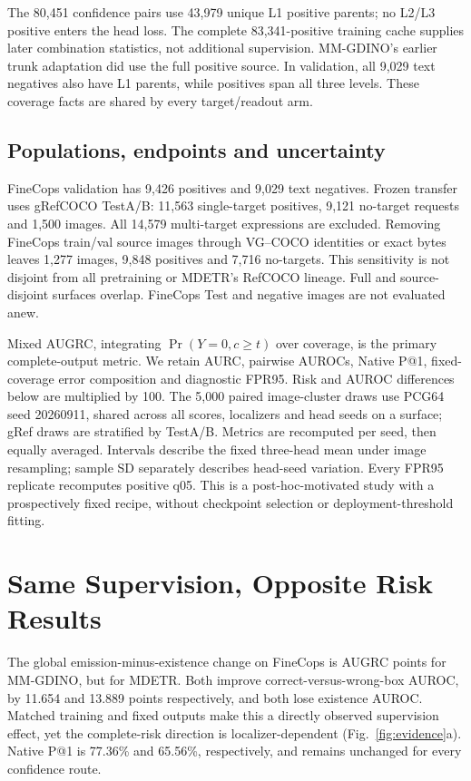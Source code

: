 \documentclass[10pt,twocolumn,letterpaper]{article}
\begin{document}
The 80,451 confidence pairs use 43,979 unique L1 positive parents;
no L2/L3 positive enters the head loss. The complete 83,341-positive
training cache supplies later combination statistics, not additional
supervision. MM-GDINO's earlier trunk adaptation did use the full positive
source. In validation, all 9,029 text negatives also have L1 parents,
while positives span all three levels. These coverage facts are shared
by every target/readout arm.

\subsection{Populations, endpoints and uncertainty}
FineCops validation has 9,426 positives and 9,029 text negatives.
Frozen transfer uses gRefCOCO TestA/B: 11,563 single-target positives,
9,121 no-target requests and 1,500 images. All 14,579 multi-target
expressions are excluded. Removing FineCops train/val source images
through VG--COCO identities or exact bytes leaves 1,277 images,
9,848 positives and 7,716 no-targets. This sensitivity is not disjoint
from all pretraining or MDETR's RefCOCO lineage. Full and source-disjoint
surfaces overlap. FineCops Test and negative images are not evaluated anew.

Mixed AUGRC, integrating $\Pr(Y=0,c\geq t)$ over coverage, is the primary
complete-output metric. We retain AURC, pairwise AUROCs, Native P@1,
fixed-coverage error composition and diagnostic FPR95. Risk and AUROC
differences below are multiplied by 100. The 5,000 paired image-cluster
draws use PCG64 seed 20260911, shared across all scores, localizers and
head seeds on a surface; gRef draws are stratified by TestA/B. Metrics
are recomputed per seed, then equally averaged. Intervals describe the
fixed three-head mean under image resampling; sample SD separately
describes head-seed variation. Every FPR95 replicate recomputes positive
q05. This is a post-hoc-motivated study with a prospectively fixed recipe,
without checkpoint selection or deployment-threshold fitting.

\section{Same Supervision, Opposite Risk Results}
The global emission-minus-existence change on FineCops is
\FCMMRisk{} AUGRC points for MM-GDINO, but \FCMDRisk{} for MDETR.
Both improve correct-versus-wrong-box AUROC, by 11.654 and 13.889
points respectively, and both lose existence AUROC. Matched training
and fixed outputs make this a directly observed supervision effect, yet the
complete-risk direction is localizer-dependent (Fig.~\ref{fig:evidence}a).
Native P@1 is 77.36\% and 65.56\%, respectively, and remains unchanged
for every confidence route.
\end{document}
